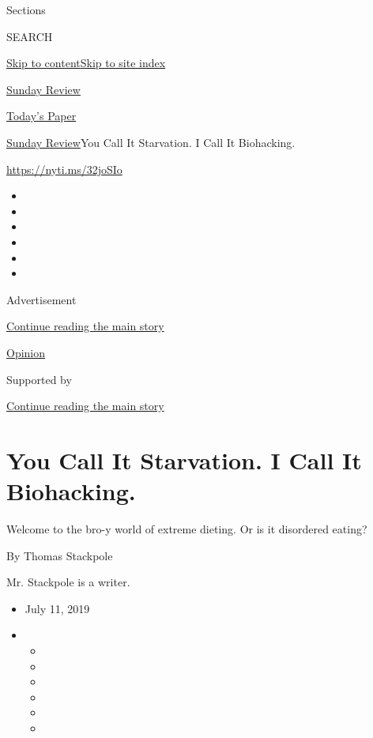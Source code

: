 Sections

SEARCH

\protect\hyperlink{site-content}{Skip to
content}\protect\hyperlink{site-index}{Skip to site index}

\href{https://www.nytimes.com/section/opinion/sunday}{Sunday Review}

\href{https://myaccount.nytimes.com/auth/login?response_type=cookie\&client_id=vi}{}

\href{https://www.nytimes.com/section/todayspaper}{Today's Paper}

\href{/section/opinion/sunday}{Sunday Review}\textbar{}You Call It
Starvation. I Call It Biohacking.

\href{https://nyti.ms/32joSIo}{https://nyti.ms/32joSIo}

\begin{itemize}
\item
\item
\item
\item
\item
\item
\end{itemize}

Advertisement

\protect\hyperlink{after-top}{Continue reading the main story}

\href{/section/opinion}{Opinion}

Supported by

\protect\hyperlink{after-sponsor}{Continue reading the main story}

\hypertarget{you-call-it-starvation-i-call-it-biohacking}{%
\section{You Call It Starvation. I Call It
Biohacking.}\label{you-call-it-starvation-i-call-it-biohacking}}

Welcome to the bro-y world of extreme dieting. Or is it disordered
eating?

By Thomas Stackpole

Mr. Stackpole is a writer.

\begin{itemize}
\item
  July 11, 2019
\item
  \begin{itemize}
  \item
  \item
  \item
  \item
  \item
  \item
  \end{itemize}
\end{itemize}

